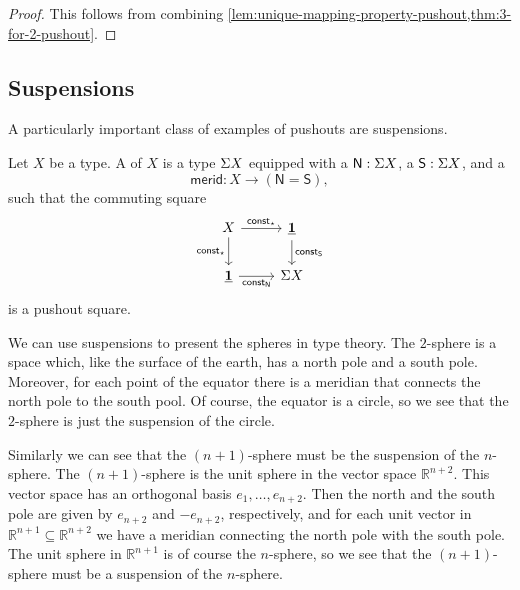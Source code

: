 \begin{proof}
  This follows from combining \cref{lem:unique-mapping-property-pushout,thm:3-for-2-pushout}.
\end{proof}

\subsection{Suspensions}
A particularly important class of examples of pushouts are suspensions.

\begin{defn}
  Let $X$ be a type. A  of $X$ is a type $\Sigma X$ equipped with a  $\mathsf{N}:\Sigma X$, a  $\mathsf{S}:\Sigma X$, and a 
  \begin{equation*}
    \mathsf{merid} : X \to (\mathsf{N}=\mathsf{S}),
  \end{equation*}
  such that the commuting square
  \begin{equation*}
    \begin{tikzcd}
      X \arrow[r,"\mathsf{const}_\ttt"] \arrow[d,swap,"\mathsf{const}_\ttt"] & \unit \arrow[d,"{\mathsf{const}_\south}"] \\
      \unit \arrow[r,swap,"\mathsf{const}_\north"] & \susp X
    \end{tikzcd}
  \end{equation*}
  is a pushout square.
\end{defn}

We can use suspensions to present the spheres in type theory. The $2$-sphere is a space which, like the surface of the earth, has a north pole and a south pole. Moreover, for each point of the equator there is a meridian that connects the north pole to the south pool. Of course, the equator is a circle, so we see that the $2$-sphere is just the suspension of the circle.

Similarly we can see that the $(n+1)$-sphere must be the suspension of the $n$-sphere. The $(n+1)$-sphere is the unit sphere in the vector space $\mathbb{R}^{n+2}$. This vector space has an orthogonal basis $e_1,\ldots,e_{n+2}$. Then the north and the south pole are given by $e_{n+2}$ and $-e_{n+2}$, respectively, and for each unit vector in $\mathbb{R}^{n+1}\subseteq\mathbb{R}^{n+2}$ we have a meridian connecting the north pole with the south pole. The unit sphere in $\mathbb{R}^{n+1}$ is of course the $n$-sphere, so we see that the $(n+1)$-sphere must be a suspension of the $n$-sphere.

